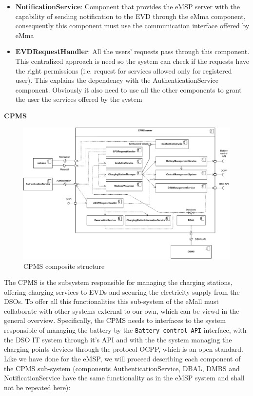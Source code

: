 \begin{itemize}
    \item \textbf{NotificationService}: Component that provides the eMSP server with the capability of sending notification to the EVD through the eMma component, consequently this component must use the communication interface offered by eMma

    \item \textbf{EVDRequestHandler}: All the users' requests pass through this component. This centralized approach is need so the system can check if the requests have the right permissions (i.e. request for services allowed only for registered user). This explains the dependency with the AuthenticationService component. Obviously it also need to use all the other components to grant the user the services offered by the system

\end{itemize}
\pagebreak

\textbf{CPMS}\\
\begin{figure}[H]
    \centering
    \includegraphics[width=1\textwidth]{Images/cp2/CPMS_server.pdf}
    \caption{CPMS composite structure}
\end{figure}

The CPMS is the subsystem responsible for managing the charging stations, offering charging services to EVDs and securing the electricity supply from the DSOs. To offer all this functionalities this sub-system of the eMall must collaborate with other systems external to our own, which can be viewd in the general overview. Specifically, the CPMS needs to interfaces to the system responsible of managing the battery by the \verb|Battery control API| interface, with the DSO IT system through it's API and with the the system managing the charging points devices through the protocol OCPP, which is an open standard. Like we have done for the eMSP, we will proceed describing each component of the CPMS sub-system (components AuthenticationService, DBAL, DMBS and NotificationService have the same functionality as in the eMSP system and shall not be repeated here):

